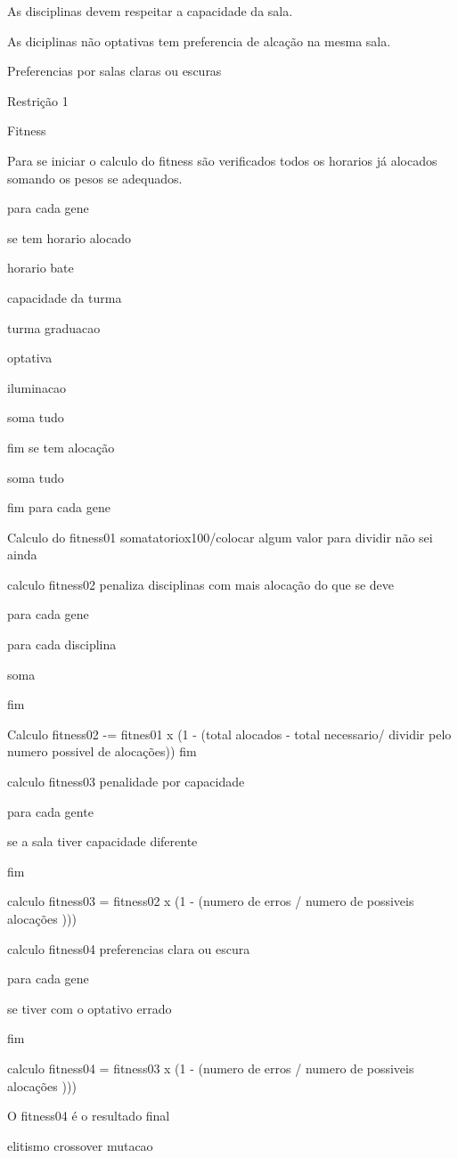 As disciplinas devem respeitar a capacidade da sala.

As diciplinas não optativas tem preferencia de alcação na mesma sala.

Preferencias por salas claras ou escuras

Restrição 1 


Fitness

Para se iniciar o calculo do fitness são verificados todos os horarios já alocados somando os pesos se adequados.

para cada gene

se tem horario alocado 

horario bate

capacidade da turma

turma graduacao

optativa

iluminacao

soma tudo

fim se tem alocação

soma tudo

fim para cada gene

Calculo do fitness01 somatatoriox100/colocar algum valor  para dividir não sei ainda

calculo fitness02 penaliza disciplinas com mais alocação do que se deve

para cada gene 

para cada disciplina 

soma

fim

Calculo fitness02 -= fitnes01 x (1 - (total alocados - total necessario/ dividir pelo numero possivel de alocações))
fim

calculo fitness03 penalidade por capacidade

para cada gente

se a sala tiver capacidade diferente

fim

calculo fitness03 = fitness02 x (1 - (numero de erros /  numero de possiveis alocações )))


calculo fitness04 preferencias clara ou escura

para cada gene 

se tiver com o optativo errado 

fim	

calculo fitness04 = fitness03 x (1 - (numero de erros /  numero de possiveis alocações )))


O fitness04 é o resultado final



elitismo
crossover
mutacao
